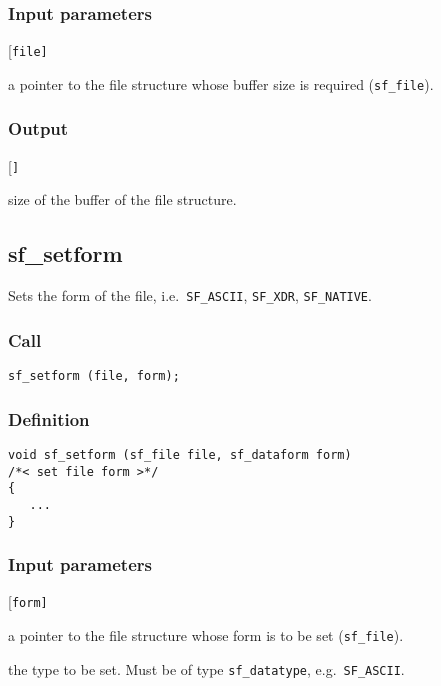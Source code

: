 \subsubsection*{Input parameters}
\begin{desclist}{\tt }{\quad}[\tt file]
   \setlength\itemsep{0pt}
   \item[file] a pointer to the file structure whose buffer size is required (\texttt{sf\_file}).  
\end{desclist}

\subsubsection*{Output}
\begin{desclist}{\tt }{\quad}[\tt ]
   \setlength\itemsep{0pt}
   \item[bufsiz] size of the buffer of the file structure.
\end{desclist}




\subsection{{sf\_setform}}
Sets the form of the file, i.e.~\texttt{SF\_ASCII}, \texttt{SF\_XDR}, \texttt{SF\_NATIVE}.

\subsubsection*{Call}
\begin{verbatim}sf_setform (file, form);\end{verbatim}

\subsubsection*{Definition}
\begin{verbatim}
void sf_setform (sf_file file, sf_dataform form)
/*< set file form >*/
{
   ...
}
\end{verbatim}

\subsubsection*{Input parameters}
\begin{desclist}{\tt }{\quad}[\tt form]
   \setlength\itemsep{0pt}
   \item[file] a pointer to the file structure whose form is to be set (\texttt{sf\_file}). 
   \item[form] the type to be set. Must be of type \texttt{sf\_datatype}, e.g.~\texttt{SF\_ASCII}.
\end{desclist}




